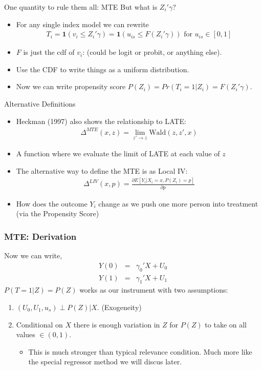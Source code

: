 \documentclass[xcolor=pdftex,dvipsnames,table,mathserif,aspectratio=169]{beamer}
\begin{document}
\begin{frame}{One quantity to rule them all: MTE}
But what is $Z_i' \gamma$?
\begin{itemize}
\item For any \alert{single index model} we can rewrite 
\begin{eqnarray*}
T_i = \mathbf{1}(v_i \leq Z_i' \gamma) = \mathbf{1}(u_{is} \leq F(Z_i' \gamma)) \mbox{ for }  u_{is} \in [0,1]
\end{eqnarray*}
\item $F$ is just the cdf of $v_i$: (could be logit or probit, or anything else).
\item Use the CDF to write things as a uniform distribution.
\item Now we can write \alert{propensity score} $P(Z_i) = Pr(T_i=1|Z_i )= F(Z_i '\gamma)$.
\end{itemize}
\end{frame}

\begin{frame}{Alternative Definitions}
\begin{itemize}
\item Heckman (1997) also shows the relationship to LATE:
\begin{align*}
\Delta^{MTE}(x, z)= \lim_{z' \rightarrow z} \text{Wald}(z,z',x)
\end{align*}
\item A function where we evaluate the limit of LATE at each value of $z$
\item The alternative way to define the MTE is as \alert{Local IV}:
\begin{eqnarray*}
\Delta^{LIV}(x, p) = \frac{\partial E[Y_i | X_i=x, P(Z_i) =p] }{\partial p}
\end{eqnarray*}
\item How does the outcome $Y_i$ change as we push one more person into treatment (via the \alert{Propensity Score})
\end{itemize}
\end{frame}




\begin{frame}
\frametitle{MTE: Derivation}
Now we can write,
\begin{eqnarray*}
Y(0) &=& \gamma_0' X + U_0\\
Y(1) &=& \gamma_1' X + U_1
\end{eqnarray*}
$P(T=1 | Z) = P(Z)$ works as our instrument with two assumptions:
\begin{enumerate}
\item $(U_0, U_1, u_s) \perp P(Z) | X$. (Exogeneity)
\item Conditional on $X$ there is enough variation in $Z$ for $P(Z)$ to take on all values $\in(0,1)$.
\begin{itemize}
\item This is much stronger than typical \alert{relevance} condition. Much more like the \alert{special regressor} method we will discus later.
\end{itemize}
\end{enumerate}
\end{frame}
\end{document}
